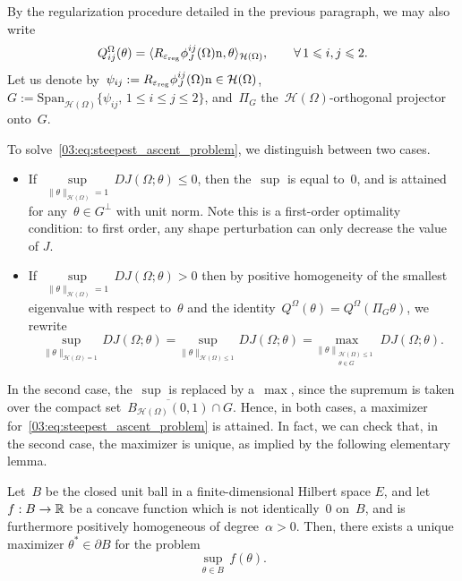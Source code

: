 By the regularization procedure detailed in the previous paragraph, we may also write
\begin{equation}
    \label{03:eq:perturbation_matrix_J_volume_form}
    Q_{ij}^{\Omega}(\theta) = \langle R_{\varepsilon_{\mathrm{reg}}}\phi^{ij}_{J}(\Omega)\mathrm{n},\theta\rangle_{\mathcal{H}(\Omega)},\qquad \forall\,1\leqslant i,j\leqslant 2.
\end{equation}
Let us denote by~$\psi_{ij}:= R_{\varepsilon_{\mathrm{reg}}}\phi^{ij}_{J}(\Omega)\mathrm{n}\in \mathcal H(\Omega)$,~$G:=\mathrm{Span}_{\mathcal H(\Omega)}\{\psi_{ij},\,1\leq i\leq j\leq 2\}$, and~$\Pi_G$ the~$\mathcal H(\Omega)$-orthogonal projector onto~$G$.

To solve~\eqref{03:eq:steepest_ascent_problem}, we distinguish between two cases.
\begin{itemize}
    \item{If~$\underset{\|\theta\|_{\mathcal H(\Omega)}=1}{\sup}\, DJ(\Omega;\theta)\leq 0$, then the~$\sup$ is equal to~$0$, and is attained for any~$\theta\in G^\perp$ with unit norm. Note this is a first-order optimality condition: to first order, any shape perturbation can only decrease the value of $J$.}
    \item{If~$\underset{\|\theta\|_{\mathcal H(\Omega)}=1}{\sup}\, DJ(\Omega;\theta)>0$ then by positive homogeneity of the smallest eigenvalue with respect to~$\theta$ and the identity~$Q^\Omega(\theta)=Q^\Omega(\Pi_G\theta)$, we rewrite 
    \begin{equation}
    \underset{\|\theta\|_{\mathcal H(\Omega)=1}}{\mathrm{sup}}\,DJ(\Omega;\theta) = \underset{\|\theta\|_{\mathcal H(\Omega)\leq 1}}{\mathrm{sup}}\,DJ(\Omega;\theta) = \underset{\|\theta\|_{\substack{\mathcal H(\Omega)\leq 1\\\theta \in G}}}{\mathrm{max}}\,DJ(\Omega;\theta).
    \end{equation}}
\end{itemize}
In the second case, the~$\sup$ is replaced by a~$\max$, since the supremum is taken over the compact set~$\overline{B_{\mathcal H(\Omega)}(0,1)}\cap G$. Hence, in both cases, a maximizer for~\eqref{03:eq:steepest_ascent_problem} is attained.
In fact, we can check that, in the second case, the maximizer is unique, as implied by the following elementary lemma.
\begin{lemma}
    Let~$B$ be the closed unit ball in a finite-dimensional Hilbert space $E$, and let $f:B\to\mathbb{R}$ be a concave function which is not identically~$0$ on~$B$, and is furthermore positively homogeneous of degree~$\alpha>0$. Then, there exists a unique maximizer $\theta^*\in \partial B$ for the problem
    \begin{equation}
        \underset{\theta\in B}{\sup}\,f(\theta).
    \end{equation}
\end{lemma}
